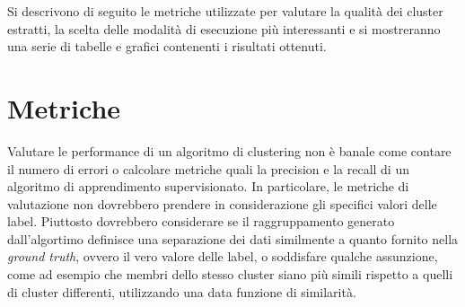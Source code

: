 Si descrivono di seguito le metriche utilizzate per valutare la qualità dei cluster estratti, la scelta delle modalità di esecuzione più interessanti e si mostreranno una serie di tabelle e grafici contenenti i risultati ottenuti. 


\section{Metriche}
Valutare le performance di un algoritmo di clustering non è banale come contare il numero di errori o calcolare metriche quali la precision e la recall di un algoritmo di apprendimento supervisionato. In particolare, le metriche di valutazione non dovrebbero prendere in considerazione gli specifici valori delle label. Piuttosto dovrebbero considerare se il raggruppamento generato dall'algortimo definisce una separazione dei dati similmente a quanto fornito nella \textit{ground truth}, ovvero il vero valore delle label, o soddisfare qualche assunzione, come ad esempio che membri dello stesso cluster siano più simili rispetto a quelli di cluster differenti, utilizzando una data funzione di similarità.

